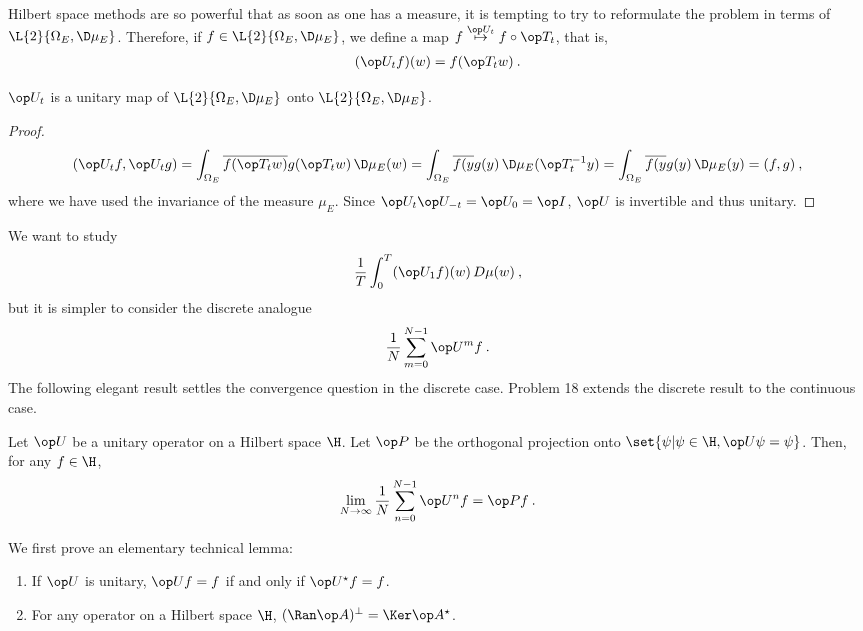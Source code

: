 Hilbert space methods are so powerful that as soon as one has a measure, it is tempting to try to reformulate the problem in terms of $\L{2}{\Omega_E, \D \mu_E}$.
Therefore, if $f \in \L{2}{\Omega_E, \D \mu_E}$, we define a map $f \overset{\op U_t}\mapsto f \circ \op T_t$, that is, \begin{align}
    (\op U_t f)(w) = f(\op T_t w) \:.
\end{align}

\begin{lemma}
    $\op U_t$ is a unitary map of $\L{2}{\Omega_E, \D \mu_E}$ onto $\L{2}{\Omega_E, \D \mu_E}$.
\end{lemma}
\begin{proof}
    \begin{align}
        (\op U_t f, \op U_t g) =
         \int_{\Omega_E} \overline{f(\op T_t w)} g(\op T_t w) \, \D \mu_E (w) =
         \int_{\Omega_E} \overline{f(y} g(y) \, \D \mu_E (\op T_t^{-1} y) =
         \int_{\Omega_E} \overline{f(y} g(y) \, \D \mu_E (y) = (f,g) \:,
    \end{align}
    where we have used the invariance of the measure $\mu_E$. Since $\op U_t \op U_{-t} = \op U_0 = \op I$, $\op U$ is invertible and thus unitary.
\end{proof}

We want to study
\begin{align}
    \frac{1}{T} \int_0^T (\op U_1 f)(w) \, D \mu(w) \:,
\end{align}
but it is simpler to consider the discrete analogue \begin{align}
    \frac{1}{N} \sum_{m=0}^{N-1} \op U^m f \:.
\end{align}
The following elegant result settles the convergence question in the discrete case. Problem 18 extends the discrete result to the continuous case.

\begin{theorem}
Let $\op U$ be a unitary operator on a Hilbert space $\H$. Let $\op P$ be the orthogonal projection onto $\set{\psi | \psi \in \H, \op U \psi = \psi}$. Then, for any $f \in \H$,
\begin{align}
    \lim_{N \rightarrow \infty} \frac{1}{N} \sum_{n=0}^{N-1} \op U^n f = \op P f \:. 
\end{align}
\end{theorem}

We first prove an elementary technical lemma:
\begin{lemma}
    \begin{enumerate}
        \item If $\op U$ is unitary, $\op U f = f$ if and only if $\op U^\star f = f$.
        \item For any operator on a Hilbert space $\H$, $(\Ran \op A)^\bot = \Ker \op A^\star$.
    \end{enumerate}
\end{lemma}

